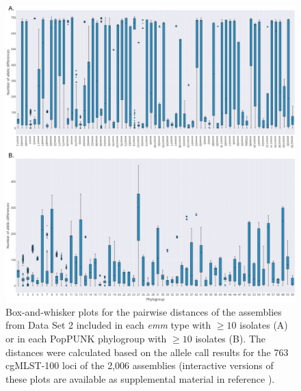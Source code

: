 \begin{figure}[!ht]
    \centering
    \includegraphics[width=\textwidth]{figures/chapter 4/Figure3.pdf}
    \caption[Box-and-whisker plots for the pairwise distances of the assemblies from Data Set 2 included in each \textit{emm} type with $\geq10$ isolates.]{Box-and-whisker plots for the pairwise distances of the assemblies from Data Set 2 \cite{davies_atlas_2019, friaes_supplemental_2023} included in each \textit{emm} type with $\geq10$ isolates (A) or in each PopPUNK phylogroup with $\geq10$ isolates (B). The distances were calculated based on the allele call results for the 763 cgMLST-100 loci of the 2,006 assemblies (interactive versions of these plots are available as supplemental material in reference \cite{friaes_supplemental_2023}).}
    \label{fig:chap4_figure3}
\end{figure}

